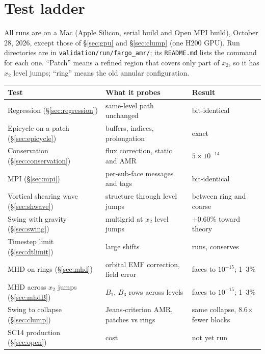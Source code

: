 \documentclass[11pt]{article}
\newcommand{\file}[1]{\texttt{\small #1}}
\begin{document}
\tableofcontents
\newpage

\section{Test ladder}
\label{sec:ladder}
All runs are on a Mac (Apple Silicon, serial build and Open MPI build), October 28, 2026,
except those of \S\ref{sec:gpu} and \S\ref{sec:clump} (one H200 GPU).
Run directories are in \file{validation/run/fargo\_amr/}; its \file{README.md} lists
the command for each one. ``Patch'' means a refined region that covers only part of
$x_2$, so it has $x_2$ level jumps; ``ring'' means the old annular configuration.

\begin{center}
\small
\begin{tabular}{@{}>{\raggedright\arraybackslash}p{4.6cm}>{\raggedright\arraybackslash}p{5.6cm}p{4.0cm}@{}}
\toprule
Test & What it probes & Result \\
\midrule
Regression (\S\ref{sec:regression}) & same-level path unchanged & bit-identical \\
Epicycle on a patch (\S\ref{sec:epicycle}) & buffers, indices, prolongation & exact \\
Conservation (\S\ref{sec:conservation}) & flux correction, static and AMR &
  $5\times10^{-14}$ \\
MPI (\S\ref{sec:mpi}) & per-sub-face messages and tags & bit-identical \\
Vortical shearing wave (\S\ref{sec:shwave}) & structure through level jumps &
  between ring and coarse \\
Swing with gravity (\S\ref{sec:swing}) & multigrid at $x_2$ level jumps & $+0.60\%$
  toward theory \\
Timestep limit (\S\ref{sec:dtlimit}) & large shifts & runs, conserves \\
MHD on rings (\S\ref{sec:mhd}) & orbital EMF correction, field error &
  faces to $10^{-15}$; 1--3\% \\
MHD across $x_2$ jumps (\S\ref{sec:mhdB}) & $B_1$, $B_3$ rows across levels &
  faces to $10^{-15}$; 1--3\% \\
Swing to collapse (\S\ref{sec:clump}) & Jeans-criterion AMR, patches vs rings &
  same collapse, 8.6$\times$ fewer blocks \\
SC14 production (\S\ref{sec:open}) & cost & not yet run \\
\bottomrule
\end{tabular}
\end{center}
\end{document}
